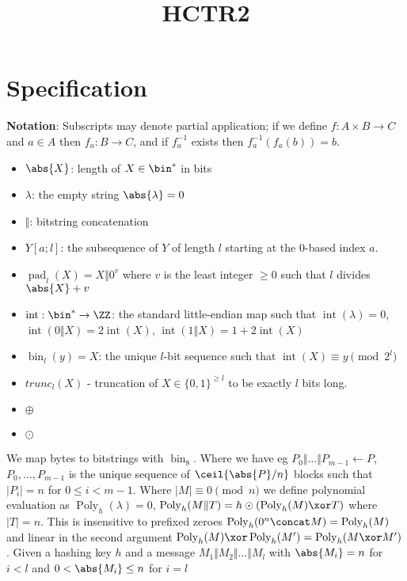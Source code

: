\documentclass[letterpaper,11pt]{article}
\title{HCTR2}
\newcommand*{\parintro}[1]{\textbf{#1}:}
\newcommand*{\Concat}{\Vert}
\DeclareMathOperator{\fromint}{bin}
\DeclareMathOperator{\intify}{int}
\DeclareMathOperator{\pad}{pad}
\DeclareMathOperator{\Poly}{Poly}
\begin{document}
\maketitle
\begin{abstract}
\end{abstract}
\section{Specification}
\parintro{Notation}
Subscripts may denote partial application; if we define $f: A \times B \rightarrow C$ and
$a \in A$ then $f_a: B \rightarrow C$, and if $f_a^{-1}$ exists then $f_a^{-1}(f_a(b)) = b$.
\begin{itemize}
    \item $\abs{X}$: length of $X \in \bin^{*}$ in bits
    \item $\lambda$: the empty string $\abs{\lambda} = 0$
    \item $\Concat$: bitstring concatenation
    \item $Y[a;l]$: the subsequence of $Y$ of length $l$ starting at the 0-based index $a$.
    \item $\pad_l(X) = X \Concat 0^v$
    where $v$ is the least integer $\geq 0$ such that $l$ divides $\abs{X} + v$
    \item $\intify: \bin^{*} \rightarrow \ZZ$: the
    standard little-endian map such that
    $\intify(\lambda) = 0$, $\intify(0 \Concat X) = 2\intify(X)$, $\intify(1 \Concat X) = 1 + 2\intify(X)$
    \item $\fromint_l(y) = X$: the unique
    $l$-bit sequence such that $\intify(X) \equiv y \pmod{2^l}$
    \item $trunc_l(X)$ - truncation of $X \in \{0,1\}^{\ge l}$ to be exactly $l$ bits long.
    \item \(\oplus\)
    \item \(\odot\)
\end{itemize}
We map bytes to bitstrings with \(\fromint_8\).
Where we have eg \(P_0 \Concat \ldots \Concat P_{m-1} \gets P\), 
\(P_0, \ldots, P_{m-1}\) is the unique sequence of \(\ceil{\abs{P}/n}\) blocks
such that \(|P_i| = n\) for \(0 \leq i < m-1\).
Where \(|M| \equiv 0 \pmod n\) we define polynomial evaluation as \(\Poly_h(\lambda) = 0\), \(\Poly_h(M \Concat T) = h \odot (\Poly_h(M) \xor T)\) where \(|T| = n\). This is insensitive to prefixed zeroes \(\Poly_h(0^n \concat M) = \Poly_h(M)\) and linear in the second argument \(\Poly_h(M) \xor \Poly_h(M') = \Poly_h(M \xor M')\).
Given a hashing key \(h\) and a message \(M_1 \Concat M_2 \Concat \ldots \Concat M_l\) with \(\abs{M_i} = n\) for \(i < l\) and \(0 < \abs{M_i} \leq n\) for \(i = l\)
\end{document}
